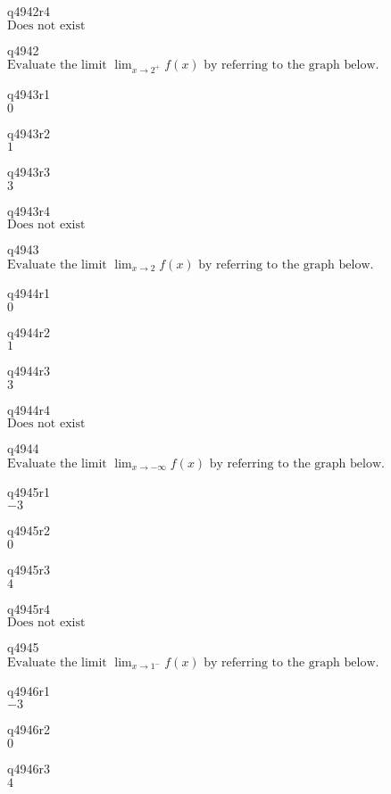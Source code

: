 q4942r4\\
\(\displaystyle \text{Does not exist} \)

q4942\\
\(\displaystyle \text{Evaluate the limit } \lim_{x \rightarrow 2^+} f(x) \text{ by referring to the graph below.} \)

q4943r1\\
\(\displaystyle 0 \)

q4943r2\\
\(\displaystyle 1 \)

q4943r3\\
\(\displaystyle 3 \)

q4943r4\\
\(\displaystyle \text{Does not exist} \)

q4943\\
\(\displaystyle \text{Evaluate the limit } \lim_{x \rightarrow 2} f(x) \text{ by referring to the graph below.} \)

q4944r1\\
\(\displaystyle 0 \)

q4944r2\\
\(\displaystyle 1 \)

q4944r3\\
\(\displaystyle 3 \)

q4944r4\\
\(\displaystyle \text{Does not exist} \)

q4944\\
\(\displaystyle \text{Evaluate the limit } \lim_{x \rightarrow -\infty} f(x) \text{ by referring to the graph below.} \)

q4945r1\\
\(\displaystyle -3 \)

q4945r2\\
\(\displaystyle 0 \)

q4945r3\\
\(\displaystyle 4 \)

q4945r4\\
\(\displaystyle \text{Does not exist} \)

q4945\\
\(\displaystyle \text{Evaluate the limit } \lim_{x \rightarrow 1^-} f(x) \text{ by referring to the graph below.} \)

q4946r1\\
\(\displaystyle -3 \)

q4946r2\\
\(\displaystyle 0 \)

q4946r3\\
\(\displaystyle 4 \)

